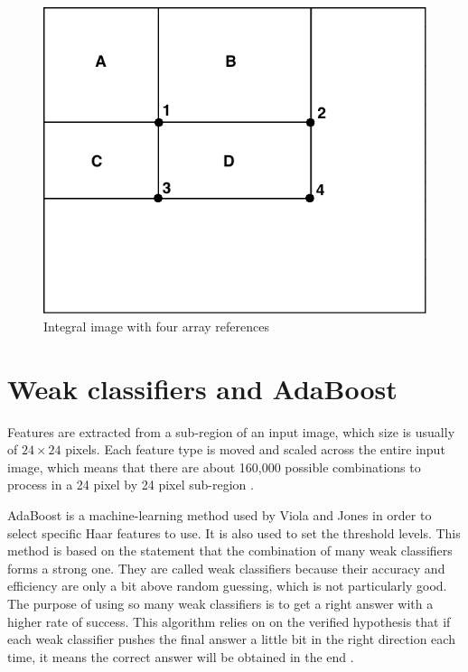 \begin{figure}[!h]
\begin{center}
\noindent \includegraphics[scale=0.4]{figures/integral_image_four_array} 
\newline
\caption{Integral image with four array references}
\label{integral_image_four_array}
\end{center} 
\end{figure}

\section{Weak classifiers and AdaBoost}

\vspace{\baselineskip}
\noindent Features are extracted from a sub-region of an input image, which size is usually of $ 24\times24 $ pixels. Each feature type is moved and scaled across the entire input image, which means that there are about 160,000 possible combinations to process in a 24 pixel by 24 pixel sub-region \cite{SMY07}.
\newline

\noindent AdaBoost is a machine-learning method used by Viola and Jones in order to select specific Haar features to use. It is also used to set the threshold levels. This method is based on the statement that the combination of many weak classifiers forms a strong one. They are called weak classifiers because their accuracy and efficiency are only a bit above random guessing, which is not particularly good. The purpose of using so many weak classifiers is to get a right answer with a higher rate of success. This algorithm relies on on the verified hypothesis that if each weak classifier pushes the final answer a little bit in the right direction each time, it means the correct answer will be obtained in the end \cite{HEW07}. 
\newline

